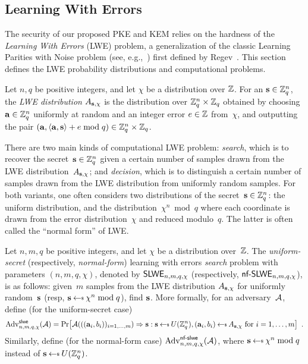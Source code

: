 \documentclass{iacrcc}
\begin{document}
\subsection{Learning With Errors}
\label{sec:lwe}

The security of our proposed PKE and KEM relies on the hardness of the
\emph{Learning With Errors} (LWE) problem, a generalization of the
classic Learning Parities with Noise problem (see,
e.g.,~\cite{C:BFKL93}) first defined by Regev~\cite{Reg09}. This
section defines the LWE probability distributions and computational
problems.

\begin{definition}
  \label{def:lwe-distrib}
  Let $n, q$ be positive integers, and let $\chi$ be a distribution
  over $\mathbb{Z}$.  For an $\mathbf{s} \in \mathbb{Z}_q^n$, the \emph{LWE
    distribution} $A_{\mathbf{s}, \chi}$ is the distribution over
  $\mathbb{Z}_q^n \times \mathbb{Z}_q$ obtained by choosing $\mathbf{a} \in \mathbb{Z}_q^n$
  uniformly at random and an integer error $e \in \mathbb{Z}$ from~$\chi$,
  and outputting the pair
  $(\mathbf{a}, \langle\mathbf{a}, \mathbf{s}\rangle + e \bmod q) \in \mathbb{Z}_q^n \times \mathbb{Z}_q$.
\end{definition}

There are two main kinds of computational LWE problem: \emph{search},
which is to recover the secret~$\mathbf{s} \in \mathbb{Z}_{q}^{n}$ given a certain
number of samples drawn from the LWE distribution~$A_{\mathbf{s}, \chi}$;
and \emph{decision}, which is to distinguish a certain number of
samples drawn from the LWE distribution from uniformly random samples.
For both variants, one often considers two distributions of the
secret~$\mathbf{s} \in \mathbb{Z}_{q}^{n}$: the uniform distribution, and the
distribution~$\chi^{n} \bmod{q}$ where each coordinate is drawn from
the error distribution~$\chi$ and reduced modulo~$q$. The latter is
often called the ``normal form'' of LWE.

\begin{definition}
  \label{def:slweproblem}
  Let $n, m, q$ be positive integers, and let $\chi$ be a distribution
  over~$\mathbb{Z}$.  The \emph{uniform-secret} (respectively,
  \emph{normal-form}) learning with errors \emph{search} problem with
  parameters $(n, m, q, \chi)$, denoted by $\textsf{\upshape\mdseries SLWE}_{n,m,q,\chi}$
  (respectively, $\textsf{\upshape\mdseries nf-SLWE}_{n,m,q,\chi}$), is as follows: given~$m$
  samples from the LWE distribution $A_{\mathbf{s}, \chi}$ for uniformly
  random~$\mathbf{s}$ (resp, $\bfs \getsr \chi^{n} \bmod q$), find $\mathbf{s}$.
  More formally, for an adversary~$\mathcal{A}$, define (for the
  uniform-secret case)
  \[ \Adv{\slwe}{n,m,q,\chi}(\Adversary) = \Pr \bracks*{
      \Adversary(((\bfa_i, b_{i}))_{i=1,\ldots,m}) \Rightarrow \bfs
      : \bfs \getsr U(\bbZ_q^n), (\bfa_{i}, b_{i}) \getsr A_{\bfs,
        \chi} \text{ for } i=1,\ldots,m } \enspace . \] Similarly,
  define (for the normal-form case)
  $\mathrm{Adv}^{\textsf{\upshape\mdseries \textsf{\upshape\mdseries nf-slwe}}}_{n,m,q,\chi}(\mathcal{A})$, where
  $\bfs \getsr \chi^{n} \bmod q$ instead of
  $\bfs \getsr U(\bbZ_{q}^{n})$.
\end{definition}
\end{document}
